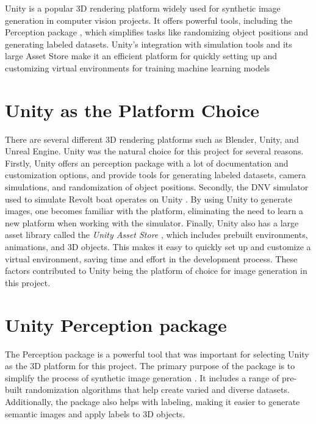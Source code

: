 Unity is a popular 3D rendering platform widely used for synthetic image generation in computer vision projects. It offers powerful tools, including the Perception package \cite{unity-perception2022}, which simplifies tasks like randomizing object positions and generating labeled datasets. Unity's integration with simulation tools and its large Asset Store \cite{UnityAssetStore} make it an efficient platform for quickly setting up and customizing virtual environments for training machine learning models

\section{Unity as the Platform Choice}
There are several different 3D rendering platforms such as Blender, Unity, and Unreal Engine. Unity was the natural choice for this project for several reasons. Firstly, Unity offers an perception package \cite{unity-perception2022} with a lot of documentation and customization options, and provide tools for generating labeled datasets, camera simulations, and randomization of object positions. Secondly, the DNV simulator used to simulate Revolt boat operates on Unity \cite{dnv_wiki}. By using Unity to generate images, one becomes familiar with the platform, eliminating the need to learn a new platform when working with the simulator. Finally, Unity also has a large asset library called the \textit{Unity Asset Store} \cite{UnityAssetStore}, which includes prebuilt environments, animations, and 3D objects. This makes it easy to quickly set up and customize a virtual environment, saving time and effort in the development process. These factors contributed to Unity being the platform of choice for image generation in this project.


\section{Unity Perception package}
The Perception package is a powerful tool that was important for selecting Unity as the 3D platform for this project. The primary purpose of the package is to simplify the process of synthetic image generation \cite{borkman2021unityperceptiongeneratesynthetic}. It includes a range of pre-built randomization algorithms that help create varied and diverse datasets. Additionally, the package also helps with labeling, making it easier to generate semantic images and apply labels to 3D objects.



